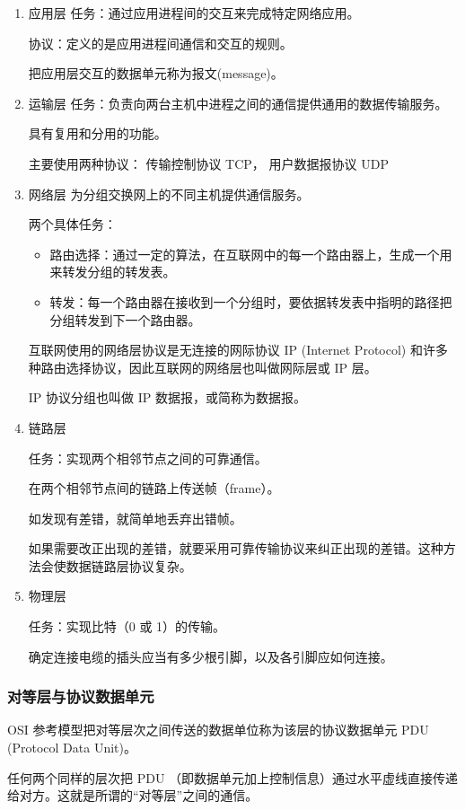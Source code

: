 \documentclass[11pt]{article}
\begin{document}
\begin{enumerate}
\item 应用层
\label{sec:org445e77f}
任务：通过应用进程间的交互来完成特定网络应用。

协议：定义的是应用进程间通信和交互的规则。

把应用层交互的数据单元称为报文(message)。
\item 运输层
\label{sec:org05ec53b}
任务：负责向两台主机中进程之间的通信提供通用的数据传输服务。

具有复用和分用的功能。

主要使用两种协议： 传输控制协议 TCP， 用户数据报协议 UDP
\item 网络层
\label{sec:org201a2b6}
为分组交换网上的不同主机提供通信服务。

两个具体任务：
\begin{itemize}
\item 路由选择：通过一定的算法，在互联网中的每一个路由器上，生成一个用来转发分组的转发表。
\item 转发：每一个路由器在接收到一个分组时，要依据转发表中指明的路径把分组转发到下一个路由器。
\end{itemize}

互联网使用的网络层协议是无连接的网际协议 IP  (Internet Protocol) 和许多种路由选择协议，因此互联网的网络层也叫做网际层或 IP 层。

IP 协议分组也叫做 IP 数据报，或简称为数据报。
\item 链路层
\label{sec:orgf84eae9}

任务：实现两个相邻节点之间的可靠通信。

在两个相邻节点间的链路上传送帧（frame）。

如发现有差错，就简单地丢弃出错帧。

如果需要改正出现的差错，就要采用可靠传输协议来纠正出现的差错。这种方法会使数据链路层协议复杂。
\item 物理层
\label{sec:orgecdc36b}

任务：实现比特（0 或 1）的传输。

确定连接电缆的插头应当有多少根引脚，以及各引脚应如何连接。
\end{enumerate}
\subsubsection{对等层与协议数据单元}
\label{sec:org55b11ff}
OSI 参考模型把对等层次之间传送的数据单位称为该层的协议数据单元 PDU (Protocol Data Unit)。

任何两个同样的层次把 PDU （即数据单元加上控制信息）通过水平虚线直接传递给对方。这就是所谓的“对等层”之间的通信。
\end{document}
